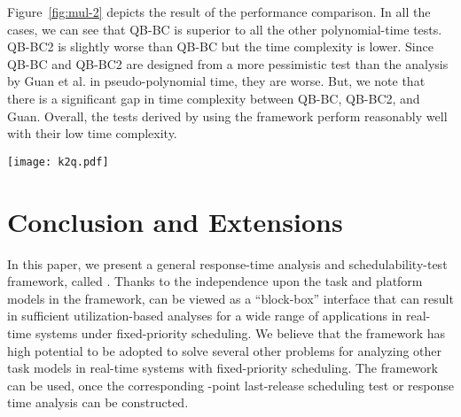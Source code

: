 \documentclass[10pt,conference]{IEEEtran}
\newcommand{\frameworkkq}[1]{}
\begin{document}
Figure~\ref{fig:mul-2} depicts the result of the performance
comparison. In all the cases, we can see that QB-BC is superior to all
the other polynomial-time tests.  QB-BC2 is slightly worse than QB-BC
but the time complexity is lower.  Since QB-BC and QB-BC2 are designed
from a more pessimistic test than the analysis by Guan et
al. \cite{DBLP:conf/rtss/GuanSYY09} in pseudo-polynomial time, they 
are worse. But, we note that
there is a significant gap in time complexity between QB-BC, QB-BC2,
and Guan.  Overall, the tests derived by using the \frameworkkq{}
framework perform reasonably well with their low time complexity.


\begin{figure*}[t]
  \centering
  \texttt{[image: k2q.pdf]}
  \caption{Acceptance ratio comparison on implicit-deadline 8 multiprocessor systems.}
  \label{fig:mul-2}
\end{figure*}


\section{Conclusion and Extensions}

In this paper, we present a general response-time analysis and
schedulability-test framework, called \frameworkkq{}. Thanks to the independence
upon the task and platform models in the framework, \frameworkkq{} can be viewed as a
``block-box'' interface that can result in sufficient
utilization-based analyses for a wide range of applications in
real-time systems under fixed-priority scheduling.  We believe that
the \frameworkkq{} framework has high potential to be adopted to solve
several other problems for analyzing other task models in real-time
systems with fixed-priority scheduling.  The framework can be used,
once the corresponding -point last-release scheduling test or
response time analysis can be constructed.  
\end{document}
